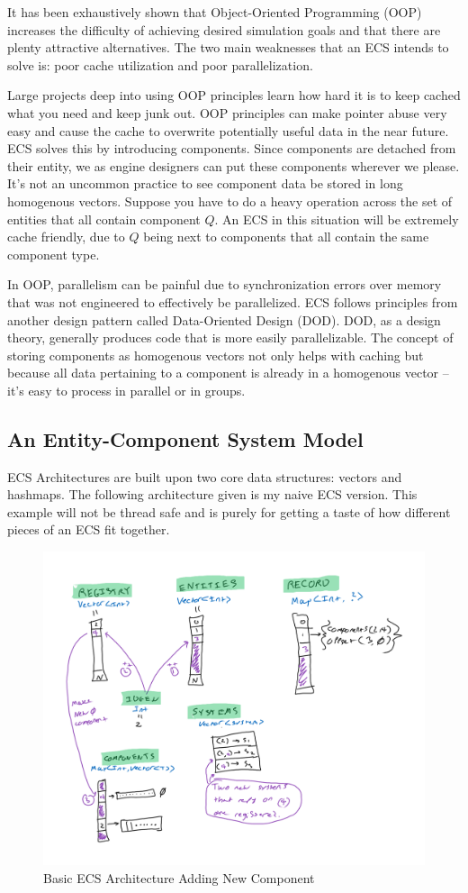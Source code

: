It has been exhaustively shown that Object-Oriented Programming (OOP) increases the difficulty of achieving desired simulation goals and that there are plenty attractive alternatives. The two main weaknesses that an ECS intends to solve is: poor cache utilization and poor parallelization.

Large projects deep into using OOP principles learn how hard it is to keep cached what you need and keep junk out. OOP principles can make pointer abuse very easy and cause the cache to overwrite potentially useful data in the near future. ECS solves this by introducing components. Since components are detached from their entity, we as engine designers can put these components wherever we please. It's not an uncommon practice to see component data be stored in long homogenous vectors. Suppose you have to do a heavy operation across the set of entities that all contain component $Q$. An ECS in this situation will be extremely cache friendly, due to $Q$ being next to components that all contain the same component type.

In OOP, parallelism can be painful due to synchronization errors over memory that was not engineered to effectively be parallelized. ECS follows principles from another design pattern called Data-Oriented Design (DOD). DOD, as a design theory, generally produces code that is more easily parallelizable. The concept of storing components as homogenous vectors not only helps with caching but because all data pertaining to a component is already in a homogenous vector -- it's easy to process in parallel or in groups.

\subsection{An Entity-Component System Model}

ECS Architectures are built upon two core data structures: vectors and hashmaps. The following architecture given is my naive ECS version. This example will not be thread safe and is purely for getting a taste of how different pieces of an ECS fit together.

\begin{figure}[htbp]
    \centering
    \includegraphics[width=0.5\linewidth]{resources/naive_ecs.png}
    \caption{Basic ECS Architecture Adding New Component}
    \label{fig:naive_ecs}
\end{figure}


